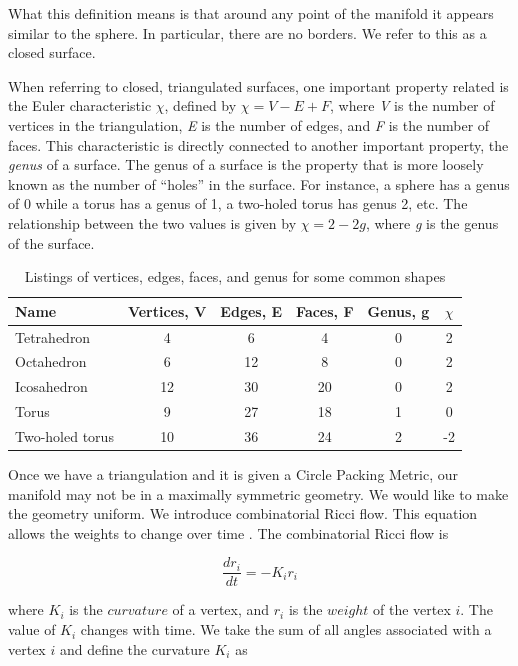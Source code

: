\documentclass[12pt]{article}
\begin{document}
 What this definition means is that around any point of the manifold it appears similar to the sphere. In particular, there are no borders. We refer to this as a closed surface.

 When referring to closed, triangulated surfaces, one important property related is the Euler characteristic $\chi$, defined by $\chi = V - E + F$, where \textit{V} is the number of vertices in the triangulation, \textit{E} is the number of edges, and \textit{F} is the number of faces. This characteristic is directly connected to another important property, the \textit{genus} of a surface. The genus of a surface is the property that is more loosely known as the number of ``holes'' in the surface. For instance, a sphere has a genus of 0 while a torus has a genus of 1, a two-holed torus has genus 2, etc. The relationship between the two values is given by $\chi = 2 - 2g$, where \textit{g} is the genus of the surface. 

\begin{table}
\begin{tabular}{lccccc}
Name  &	Vertices, V &	Edges, E & Faces, F &	Genus, g & $\chi$\\
\hline 
Tetrahedron &	4 &	6 &	4 &	0 & 2\\
Octahedron 	&	6 &	12 &	8 & 0 &	 2\\
Icosahedron &	12 & 30 & 20 & 0	&	 2\\
Torus & 9 & 27 & 18 &	1 & 0\\
Two-holed torus & 10 & 36 & 24 &	2 & -2\\
\end{tabular}
\caption{Listings of vertices, edges, faces, and genus for some common shapes}
\label{EuChar}
\end{table}

 Once we have a triangulation and it is given a Circle Packing Metric, our manifold may not be in a maximally symmetric geometry. We would like to make the geometry uniform. We introduce combinatorial Ricci flow. This equation allows the weights to change over time \cite{chowluo}. The combinatorial Ricci flow is

  \begin{equation}
  \label{Riccif}
  \frac{dr_i}{{dt}} = -K_ir_i
  \end{equation}
  
 where $K_i$ is the $curvature$ of a vertex, and $r_i$ is the $weight$ of the vertex $i$. The value of $K_i$ changes with time. We take the sum of all angles associated with a vertex $i$ and define the curvature $K_i$ as
\end{document}
